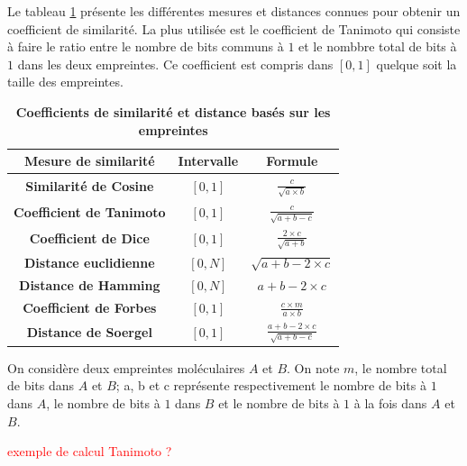 Le tableau \ref{tableauempreintes} présente les différentes mesures et distances connues pour obtenir un coefficient de similarité. La plus utilisée est le coefficient de Tanimoto qui consiste à faire le ratio entre le nombre de bits communs à $1$ et le nombbre total de bits à $1$ dans les deux empreintes. Ce coefficient est compris dans $[0,1]$ quelque soit la taille des empreintes. 

\begin{center}

\begin{table}[!ht]

\label{tableauempreintes}
\centering
\caption{
{\bf Coefficients de similarité et distance basés sur les empreintes}}
\begin{tabular}{|c|c|c|}
\hline
\textbf{Mesure de similarité }& \textbf{Intervalle} & \textbf{Formule} \\
\hline
\textbf{Similarité de Cosine}& $[0,1]$ & $\frac{c}{\sqrt{a\times b}}$\\
\hline
\textbf{Coefficient de Tanimoto}& $[0,1]$ & $\frac{c}{\sqrt{a+ b - c}}$\\
\hline
\textbf{Coefficient de Dice }& $[0,1]$ & $\frac{2 \times c}{\sqrt{a+ b}}$\\
\hline
\textbf{Distance euclidienne}& $[0,N]$ & $\sqrt{a + b - 2 \times c}$\\
\hline
\textbf{Distance de Hamming}& $[0,N]$ & $a + b - 2 \times c$\\
\hline
\textbf{Coefficient de Forbes}& $[0,1]$ & $\frac{c \times m}{
a \times b }$\\
\hline
\textbf{Distance de Soergel }& $[0,1]$ & $\frac{a + b - 2 \times c}{\sqrt{a+ b - c}}$\\
\hline


\end{tabular}
\vspace*{0.4cm}

On considère deux empreintes moléculaires $A$ et $B$. On note $m$, le nombre total de bits dans $A$ et $B$; a, b et c représente respectivement le nombre de bits à $1$ dans $A$, le nombre de bits à $1$ dans $B$ et le nombre de bits à $1$ à la fois dans $A$ et $B$.

\end{table}
\end{center}

\textcolor{red}{exemple de calcul Tanimoto ?}


